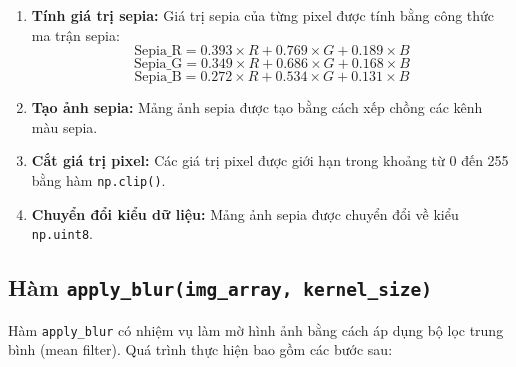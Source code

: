 \begin{enumerate}

	\item \textbf{Tính giá trị sepia:}
	      Giá trị sepia của từng pixel được tính bằng công thức ma trận sepia:
	      \[
		      \text{Sepia\_R} = 0.393 \times R + 0.769 \times G + 0.189 \times B
	      \]
	      \[
		      \text{Sepia\_G} = 0.349 \times R + 0.686 \times G + 0.168 \times B
	      \]
	      \[
		      \text{Sepia\_B} = 0.272 \times R + 0.534 \times G + 0.131 \times B
	      \]

	\item \textbf{Tạo ảnh sepia:}
	      Mảng ảnh sepia được tạo bằng cách xếp chồng các kênh màu sepia.

	\item \textbf{Cắt giá trị pixel:}
	      Các giá trị pixel được giới hạn trong khoảng từ 0 đến 255 bằng hàm \texttt{np.clip()}.

	\item \textbf{Chuyển đổi kiểu dữ liệu:}
	      Mảng ảnh sepia được chuyển đổi về kiểu \texttt{np.uint8}.

\end{enumerate}

\subsection{Hàm \texttt{apply\_blur(img\_array, kernel\_size)}}
Hàm \texttt{apply\_blur} có nhiệm vụ làm mờ hình ảnh bằng cách áp dụng bộ lọc trung bình (mean filter). Quá trình thực hiện bao gồm các bước sau:

